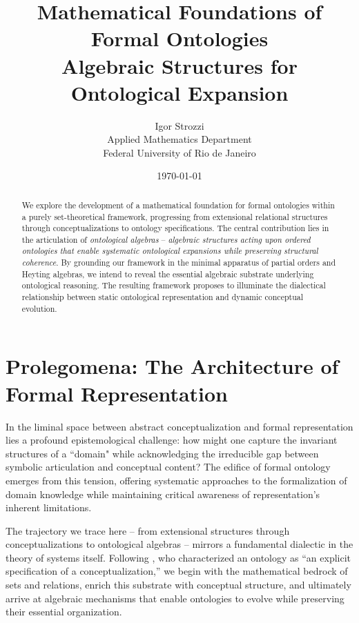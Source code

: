 \documentclass[11pt,a4paper]{article}
\title{Mathematical Foundations of Formal Ontologies\\
\Large{Algebraic Structures for Ontological Expansion}}
\author{Igor Strozzi\\
Applied Mathematics Department\\
Federal University of Rio de Janeiro}
\date{\today}
\begin{document}
\maketitle

\begin{abstract}
We explore the development of a mathematical foundation for formal ontologies within a purely set-theoretical framework, progressing from extensional relational structures through conceptualizations to ontology specifications. The central contribution lies in the articulation of \emph{ontological algebras} -- \textit{algebraic structures acting upon ordered ontologies that enable systematic ontological expansions while preserving structural coherence}. By grounding our framework in the minimal apparatus of partial orders and Heyting algebras, we intend to reveal the essential algebraic substrate underlying ontological reasoning. The resulting framework proposes to illuminate the dialectical relationship between static ontological representation and dynamic conceptual evolution.
\end{abstract}

\tableofcontents
\newpage

\section{Prolegomena: The Architecture of Formal Representation}

In the liminal space between abstract conceptualization and formal representation lies a profound epistemological challenge: how might one capture the invariant structures of a ``domain" while acknowledging the irreducible gap between symbolic articulation and conceptual content? The edifice of formal ontology emerges from this tension, offering systematic approaches to the formalization of domain knowledge while maintaining critical awareness of representation's inherent limitations.

The trajectory we trace here -- from extensional structures through conceptualizations to ontological algebras -- mirrors a fundamental dialectic in the theory of systems itself. Following \citet{gruber1993, guarino2009}, who characterized an ontology as ``an explicit specification of a conceptualization,'' we begin with the mathematical bedrock of sets and relations, enrich this substrate with conceptual structure, and ultimately arrive at algebraic mechanisms that enable ontologies to evolve while preserving their essential organization.
\end{document}
